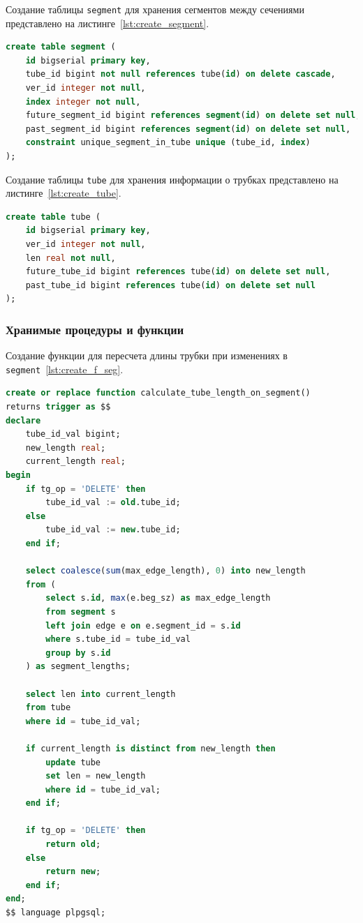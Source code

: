 \noindent
\hspace{1.25cm}
Создание таблицы \texttt{segment} для хранения сегментов между сечениями представлено на листинге~\ref{lst:create_segment}.

\begin{lstlisting}[caption={Создание таблицы segment}, label=lst:create_segment, language=SQL]
create table segment (
    id bigserial primary key,
    tube_id bigint not null references tube(id) on delete cascade,
    ver_id integer not null,
    index integer not null,
    future_segment_id bigint references segment(id) on delete set null,
    past_segment_id bigint references segment(id) on delete set null,
    constraint unique_segment_in_tube unique (tube_id, index)
);
\end{lstlisting}


\noindent
\hspace{1.25cm}
Создание таблицы \texttt{tube} для хранения информации о трубках представлено на листинге~\ref{lst:create_tube}.

\begin{lstlisting}[caption={Создание таблицы tube}, label=lst:create_tube, language=SQL]
create table tube (
    id bigserial primary key,
    ver_id integer not null,
    len real not null,
    future_tube_id bigint references tube(id) on delete set null,
    past_tube_id bigint references tube(id) on delete set null
);
\end{lstlisting}

\subsubsection{Хранимые процедуры и функции}

\noindent
\hspace{1.25cm}
Создание функции для пересчета длины трубки при изменениях в \texttt{segment}~\ref{lst:create_f_seg}.

\begin{lstlisting}[caption={Функция для пересчета длины трубки при изменениях в \texttt{segment}}, label=lst:create_f_seg, language=SQL]
create or replace function calculate_tube_length_on_segment()
returns trigger as $$
declare
    tube_id_val bigint;
    new_length real;
    current_length real;
begin
    if tg_op = 'DELETE' then
        tube_id_val := old.tube_id;
    else
        tube_id_val := new.tube_id;
    end if;

    select coalesce(sum(max_edge_length), 0) into new_length
    from (
        select s.id, max(e.beg_sz) as max_edge_length
        from segment s
        left join edge e on e.segment_id = s.id
        where s.tube_id = tube_id_val
        group by s.id
    ) as segment_lengths;
    
    select len into current_length
    from tube
    where id = tube_id_val;

    if current_length is distinct from new_length then
        update tube
        set len = new_length
        where id = tube_id_val;
    end if;

    if tg_op = 'DELETE' then
        return old;
    else
        return new;
    end if;
end;
$$ language plpgsql;
\end{lstlisting}

